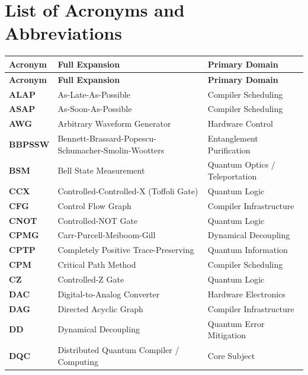 \chapter*{List of Acronyms and Abbreviations}


\small
\begin{xltabular}{\textwidth}{p{2.4cm} p{7.2cm} X}
    \toprule
    \textbf{Acronym} & \textbf{Full Expansion} & \textbf{Primary Domain} \\
    \midrule
    \endfirsthead
    \toprule
    \textbf{Acronym} & \textbf{Full Expansion} & \textbf{Primary Domain} \\
    \midrule
    \endhead
    \bottomrule
    \endfoot
    \textbf{ALAP} & As-Late-As-Possible & Compiler Scheduling \\
    \textbf{ASAP} & As-Soon-As-Possible & Compiler Scheduling \\
    \textbf{AWG} & Arbitrary Waveform Generator & Hardware Control \\
    \textbf{BBPSSW} & Bennett-Brassard-Popescu-Schumacher-Smolin-Wootters & Entanglement Purification \\
    \textbf{BSM} & Bell State Measurement & Quantum Optics / Teleportation \\
    \textbf{CCX} & Controlled-Controlled-X (Toffoli Gate) & Quantum Logic \\
    \textbf{CFG} & Control Flow Graph & Compiler Infrastructure \\
    \textbf{CNOT} & Controlled-NOT Gate & Quantum Logic \\
    \textbf{CPMG} & Carr-Purcell-Meiboom-Gill & Dynamical Decoupling \\
    \textbf{CPTP} & Completely Positive Trace-Preserving & Quantum Information \\
    \textbf{CPM} & Critical Path Method & Compiler Scheduling \\
    \textbf{CZ} & Controlled-Z Gate & Quantum Logic \\
    \textbf{DAC} & Digital-to-Analog Converter & Hardware Electronics \\
    \textbf{DAG} & Directed Acyclic Graph & Compiler Infrastructure \\
    \textbf{DD} & Dynamical Decoupling & Quantum Error Mitigation \\
    \textbf{DQC} & Distributed Quantum Compiler / Computing & Core Subject \\

\end{xltabular}
